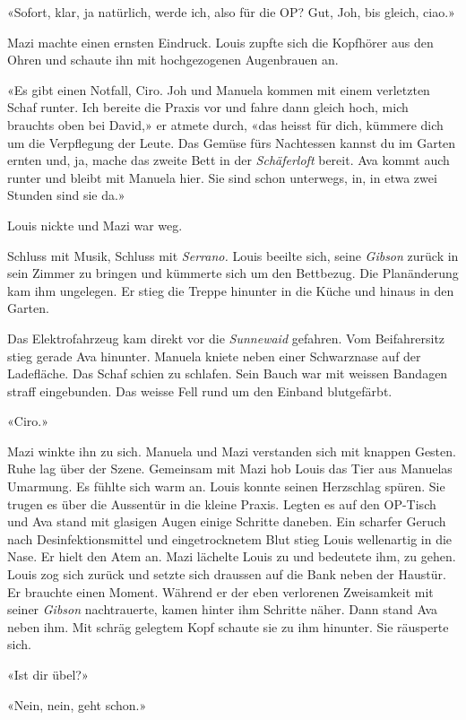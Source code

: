 «Sofort, klar, ja natürlich, werde ich, also für die OP? Gut, Joh, bis
gleich, ciao.»

Mazi machte einen ernsten Eindruck. Louis zupfte sich die Kopfhörer aus
den Ohren und schaute ihn mit hochgezogenen Augenbrauen an.

«Es gibt einen Notfall, Ciro. Joh und Manuela kommen mit einem
verletzten Schaf runter. Ich bereite die Praxis vor und fahre dann
gleich hoch, mich brauchts oben bei David,» er atmete durch, «das heisst
für dich, kümmere dich um die Verpflegung der Leute. Das Gemüse fürs
Nachtessen kannst du im Garten ernten und, ja, mache das zweite Bett in
der \emph{Schäferloft} bereit. Ava kommt auch runter und bleibt mit
Manuela hier. Sie sind schon unterwegs, in, in etwa zwei Stunden sind
sie da.»

Louis nickte und Mazi war weg.

Schluss mit Musik, Schluss mit \emph{Serrano.} Louis beeilte sich, seine
\emph{Gibson} zurück in sein Zimmer zu bringen und kümmerte sich um den
Bettbezug. Die Planänderung kam ihm ungelegen. Er stieg die Treppe
hinunter in die Küche und hinaus in den Garten.

Das Elektrofahrzeug kam direkt vor die \emph{Sunnewaid} gefahren. Vom
Beifahrersitz stieg gerade Ava hinunter. Manuela kniete neben einer
Schwarznase auf der Ladefläche. Das Schaf schien zu schlafen. Sein Bauch
war mit weissen Bandagen straff eingebunden. Das weisse Fell rund um den
Einband blutgefärbt.

«Ciro.»

Mazi winkte ihn zu sich. Manuela und Mazi verstanden sich mit knappen
Gesten. Ruhe lag über der Szene. Gemeinsam mit Mazi hob Louis das Tier
aus Manuelas Umarmung. Es fühlte sich warm an. Louis konnte seinen
Herzschlag spüren. Sie trugen es über die Aussentür in die kleine
Praxis. Legten es auf den OP-Tisch und Ava stand mit glasigen Augen
einige Schritte daneben. Ein scharfer Geruch nach Desinfektionsmittel
und eingetrocknetem Blut stieg Louis wellenartig in die Nase. Er hielt
den Atem an. Mazi lächelte Louis zu und bedeutete ihm, zu gehen. Louis
zog sich zurück und setzte sich draussen auf die Bank neben der Haustür.
Er brauchte einen Moment. Während er der eben verlorenen Zweisamkeit mit
seiner \emph{Gibson} nachtrauerte, kamen hinter ihm Schritte näher. Dann
stand Ava neben ihm. Mit schräg gelegtem Kopf schaute sie zu ihm
hinunter. Sie räusperte sich.

«Ist dir übel?»

«Nein, nein, geht schon.»

